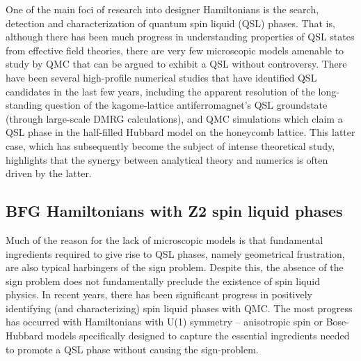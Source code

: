 \documentclass[range]{ar2e}
\begin{document}
One of the main foci of research into designer Hamiltonians is the search, detection and characterization of quantum spin liquid (QSL) phases.  
That is, although there has been much progress in understanding properties of QSL states from effective field theories, there are very few microscopic models amenable to study by QMC that can be argued to exhibit a QSL without controversy.
There have been several high-profile numerical studies that have identified QSL candidates in the last few years, including the apparent resolution of the long-standing question of the kagome-lattice antiferromagnet's QSL groundstate (through large-scale DMRG calculations), and QMC simulations which claim a QSL phase in the half-filled Hubbard model on the honeycomb lattice.  This latter case, which has subsequently become the subject of intense theoretical study, highlights that the synergy between analytical theory and numerics is often driven by the latter.

\subsection{BFG\cite{BFG} Hamiltonians with Z2 spin liquid phases}

Much of the reason for the lack of microscopic models is that fundamental ingredients required to give rise to QSL phases, namely geometrical frustration, are also typical harbingers of the sign problem.  Despite this,  the absence of the sign problem does not fundamentally preclude the existence of spin liquid physics.  In recent years, there has been significant progress in positively identifying (and characterizing) spin liquid phases with QMC.  The most progress has occurred with Hamiltonians with U(1) symmetry -- anisotropic spin or Bose-Hubbard models specifically designed to capture the essential ingredients needed to promote a QSL phase without causing the sign-problem.

\end{document}
